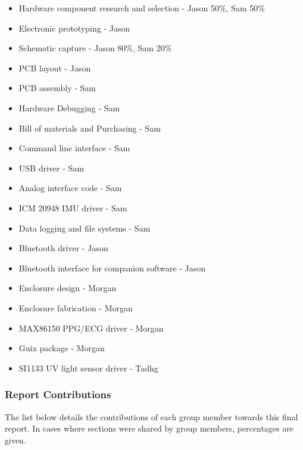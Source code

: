 \begin{itemize}
    \item Hardware component research and selection - Jason 50\%, Sam 50\%
    \item Electronic prototyping - Jason
    \item Schematic capture - Jason 80\%, Sam 20\%
    \item PCB layout - Jason
    \item PCB assembly - Sam
    \item Hardware Debugging - Sam
    \item Bill of materials and Purchasing - Sam
    \item Command line interface - Sam
    \item USB driver - Sam
    \item Analog interface code - Sam
    \item ICM 20948 IMU driver - Sam
    \item Data logging and file systems - Sam
    \item Bluetooth driver - Jason
    \item Bluetooth interface for companion software - Jason
    \item Enclosure design - Morgan
    \item Enclosure fabrication - Morgan
    \item MAX86150 PPG/ECG driver - Morgan
    \item Guix package - Morgan
    \item SI1133 UV light sensor driver - Tadhg
\end{itemize}

\subsubsection{Report Contributions}
The list below details the contributions of each group member towards this final
report. In cases where sections were shared by group members, percentages are
given.


